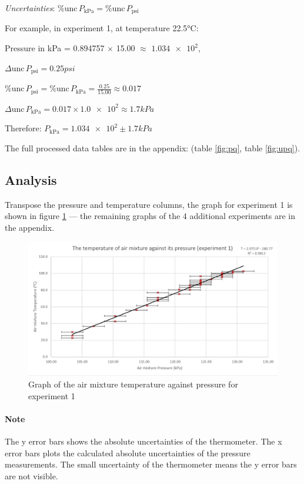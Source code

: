 \documentclass[a4paper,12pt]{article}
\newcommand{\absun}{\Delta \text{unc}\,}
\newcommand{\relun}{\% \text{unc}\,}
\begin{document}
\textit{Uncertainties}: $\relun P_{\text{kPa}} = \relun P_{\text{psi}}$

For example, in experiment 1, at temperature 22.5$\si{\celsius}$:

Pressure in kPa = 0.894757 $\times$ 15.00 $\approx$ $\num{1.034e+2}$,

$\absun P_{\text{psi}} = 0.25\si{psi}$

$\relun P_{\text{psi}} = \relun P_{\text{kPa}} =  \frac{0.25}{15.00} \approx 0.017$

$\absun P_{\text{kPa}} = 0.017 \times \num{1.0e+2} \approx \num{1.7} \si{kPa}$

Therefore: $P_{\text{kPa}} = \num{1.034e+2} \pm \num{1.7} \si{kPa}$

The full processed data tables are in the appendix: (table \ref{fig:pq}, table \ref{fig:upq}).

\newpage
\subsection{Analysis}

Transpose the pressure and temperature columns, the graph for experiment 1 is shown in figure \ref{fig:t1} --- the remaining graphs of the 4 additional experiments are in the appendix.

\begin{figure}[H]
    \centering
    \includegraphics[width=\textwidth]{assets/graph1.png}
    \caption{Graph of the air mixture temperature against pressure for experiment 1}
    \label{fig:t1}
\end{figure}

\paragraph{Note} The y error bars shows the absolute uncertainties of the thermometer. The x error bars plots the calculated absolute uncertainties of the pressure measurements. The small uncertainty of the thermometer means the y error bars are not visible.
\end{document}
